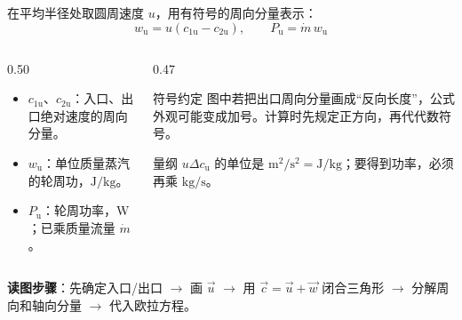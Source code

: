 \begin{frame}[t,shrink]{}
在平均半径处取圆周速度 \(u\)，用有符号的周向分量表示：
$$
w_{\mathrm{u}}=u\left(c_{1\mathrm{u}}-c_{2\mathrm{u}}\right),
\qquad
P_{\mathrm{u}}=\dot m\,w_{\mathrm{u}}
$$
\begin{columns}[T,onlytextwidth]
\begin{column}{0.50\textwidth}
  \begin{itemize}
    \item \(c_{1\mathrm{u}}\)、\(c_{2\mathrm{u}}\)：入口、出口绝对速度的周向分量。
    \item \(w_{\mathrm{u}}\)：单位质量蒸汽的轮周功，\(\mathrm{J/kg}\)。
    \item \(P_{\mathrm{u}}\)：轮周功率，\(\mathrm{W}\)；已乘质量流量 \(\dot m\)。
  \end{itemize}
\end{column}
\begin{column}{0.47\textwidth}
  \begin{keybox}{符号约定}
  \small 图中若把出口周向分量画成“反向长度”，公式外观可能变成加号。计算时先规定正方向，再代代数符号。
  \end{keybox}
  \vspace{0.7mm}
  \begin{amberbox}{量纲}
  \small \(u\Delta c_{\mathrm{u}}\) 的单位是 \(\mathrm{m^2/s^2}=\mathrm{J/kg}\)；要得到功率，必须再乘 \(\mathrm{kg/s}\)。
  \end{amberbox}
\end{column}
\end{columns}
\vspace{0.5mm}
\begin{plainbox}
\small \textbf{读图步骤}：先确定入口/出口 $\rightarrow$ 画 \(\vec u\) $\rightarrow$ 用 \(\vec c=\vec u+\vec w\) 闭合三角形 $\rightarrow$ 分解周向和轴向分量 $\rightarrow$ 代入欧拉方程。
\end{plainbox}
\end{frame}

